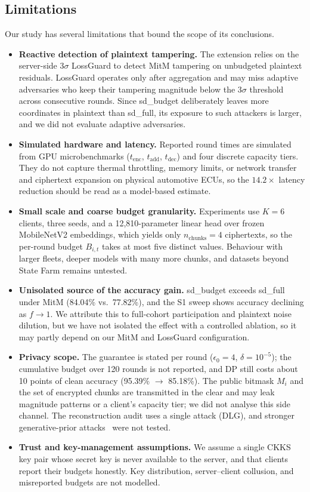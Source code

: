 \documentclass[acmtog,nonacm]{acmart}
\begin{document}
\subsection{Limitations}
Our study has several limitations that bound the scope of its conclusions.
\begin{itemize}
\item \textbf{Reactive detection of plaintext tampering.} The extension relies on the server-side $3\sigma$ LossGuard to detect MitM tampering on unbudgeted plaintext residuals. LossGuard operates only after aggregation and may miss adaptive adversaries who keep their tampering magnitude below the $3\sigma$ threshold across consecutive rounds. Since sd\_budget deliberately leaves more coordinates in plaintext than sd\_full, its exposure to such attackers is larger, and we did not evaluate adaptive adversaries.
\item \textbf{Simulated hardware and latency.} Reported round times are simulated from GPU microbenchmarks ($t_{\mathrm{enc}}$, $t_{\mathrm{add}}$, $t_{\mathrm{dec}}$) and four discrete capacity tiers. They do not capture thermal throttling, memory limits, or network transfer and ciphertext expansion on physical automotive ECUs, so the $14.2\times$ latency reduction should be read as a model-based estimate.
\item \textbf{Small scale and coarse budget granularity.} Experiments use $K=6$ clients, three seeds, and a 12,810-parameter linear head over frozen MobileNetV2 embeddings, which yields only $n_{\mathrm{chunks}}=4$ ciphertexts, so the per-round budget $B_{i,t}$ takes at most five distinct values. Behaviour with larger fleets, deeper models with many more chunks, and datasets beyond State Farm remains untested.
\item \textbf{Unisolated source of the accuracy gain.} sd\_budget exceeds sd\_full under MitM (84.04\% vs.\ 77.82\%), and the S1 sweep shows accuracy declining as $f \to 1$. We attribute this to full-cohort participation and plaintext noise dilution, but we have not isolated the effect with a controlled ablation, so it may partly depend on our MitM and LossGuard configuration.
\item \textbf{Privacy scope.} The guarantee is stated per round ($\epsilon_0=4$, $\delta=10^{-5}$); the cumulative budget over 120 rounds is not reported, and DP still costs about 10 points of clean accuracy (95.39\% $\to$ 85.18\%). The public bitmask $M_i$ and the set of encrypted chunks are transmitted in the clear and may leak magnitude patterns or a client's capacity tier; we did not analyse this side channel. The reconstruction audit uses a single attack (DLG), and stronger generative-prior attacks~\cite{gong2026ares,li2025cggl} were not tested.
\item \textbf{Trust and key-management assumptions.} We assume a single CKKS key pair whose secret key is never available to the server, and that clients report their budgets honestly. Key distribution, server--client collusion, and misreported budgets are not modelled.
\end{itemize}
\end{document}
